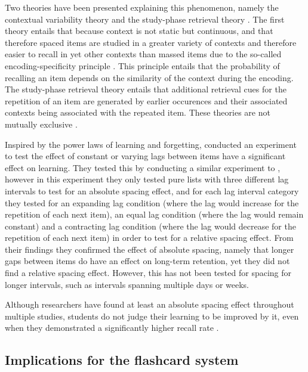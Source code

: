 Two theories have been presented explaining this phenomenon, namely the contextual variability theory and the study-phase retrieval theory \cite{siegel}. The first theory entails that because context is not static but continuous, and that therefore spaced items are studied in a greater variety of contexts and therefore easier to recall in yet other contexts than massed items due to the so-called encoding-specificity principle \cite{cognitivepsychology}. This principle entails that the probability of recalling an item depends on the similarity of the context during the encoding. The study-phase retrieval theory entails that additional retrieval cues for the repetition of an item are generated by earlier occurences and their associated contexts being associated with the repeated item. These theories are not mutually exclusive \cite{siegel}.

Inspired by the power laws of learning and forgetting,  conducted an experiment to test the effect of constant or varying lags between items have a significant effect on learning. They tested this by conducting a similar experiment to , however in this experiment they only tested pure lists with three different lag intervals to test for an absolute spacing effect, and for each lag interval category they tested for an expanding lag condition (where the lag would increase for the repetition of each next item), an equal lag condition (where the lag would remain constant) and a contracting lag condition (where the lag would decrease for the repetition of each next item) in order to test for a relative spacing effect. From their findings they confirmed the effect of absolute spacing, namely that longer gaps between items do have an effect on long-term retention, yet they did not find a relative spacing effect. However, this has not been tested for spacing for longer intervals, such as intervals spanning multiple days or weeks.

Although researchers have found at least an absolute spacing effect throughout multiple studies, students do not judge their learning to be improved by it, even when they demonstrated a significantly higher recall rate \cite{logan}.

\subsection{Implications for the flashcard system}

